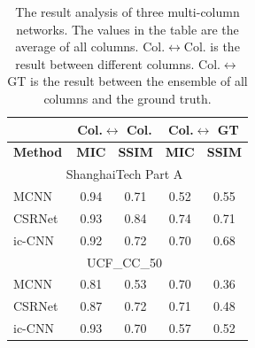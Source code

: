 \documentclass[sigconf]{acmart}
\newcommand{\ljx}[1]{\textcolor{black}{#1}}
\newcommand{\czq}[1]{\textcolor{black}{#1}}
\begin{document}
\begin{table}[!t]
\small
\caption{\small The result analysis of three multi-column networks. The
values in the table are the average of all columns. Col.$\leftrightarrow$Col. is the
result between different columns. Col.$\leftrightarrow$GT is the result between
the ensemble of all columns and the ground truth.
}
\renewcommand\arraystretch{0.89}
\begin{center}
\vspace{-4mm}
\begin{tabular}{|l|c|c|c|c|} 
\hline
& \multicolumn{2}{c|}{\textbf{Col.$\leftrightarrow$ Col. }}      
& \multicolumn{2}{c|}{\textbf{Col.$\leftrightarrow$ GT }}  \\ 
\hline
\textbf{Method} & \textbf{MIC} & \textbf{SSIM} & \textbf{MIC} & \textbf{SSIM}\\ 
\hline \hline
\multicolumn{5}{|c|}{{ShanghaiTech Part A}~\cite{MCNN-16}}             \\ 
\hline
MCNN~\cite{MCNN-16}     &  0.94   & 0.71    &   0.52  &     0.55  \\
CSRNet~\cite{CSRNet-18}    &  0.93    &  0.84    &   0.74   &   0.71 \\
ic-CNN~\cite{deep-training-ICCNN-18}    &  0.92  & 0.72 & 0.70  & 0.68  \\ 
\hline\hline
\multicolumn{5}{|c|}{{UCF\_CC\_50}~\cite{r-mrf-count-multi-source-13}}             \\ 
\hline
MCNN~\cite{MCNN-16}       & 0.81  & 0.53  &  0.70 &   0.36    \\
CSRNet~\cite{CSRNet-18}   & 0.87  & 0.72  &  0.71  &  0.48 \\
ic-CNN~\cite{deep-training-ICCNN-18}    & 0.93  & 0.70  &  0.57  & 0.52      \\
\hline
\end{tabular}
\end{center}
\vspace{-6mm}
\label{tab:Multi-columns-problem}
\end{table}
\end{document}
